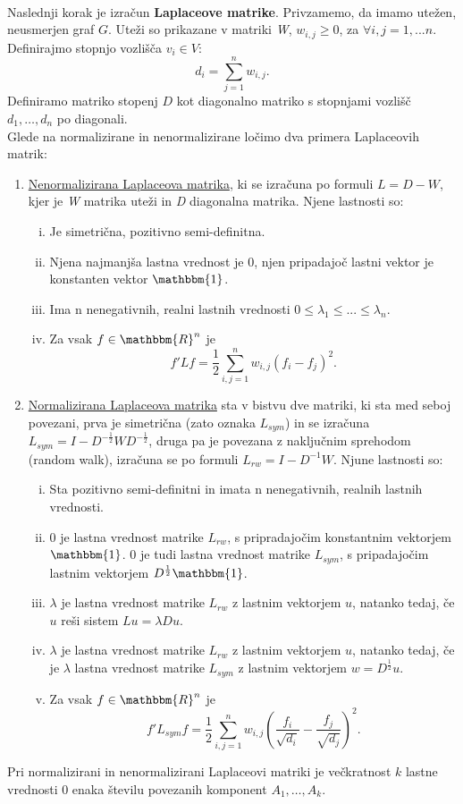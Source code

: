 \documentclass[a4paper, 10pt]{article}
\begin{document}
\\
Naslednji korak je izračun \textbf{Laplaceove matrike}. Privzamemo, da imamo utežen, neusmerjen graf $G$. Uteži so prikazane v matriki \textsl{W}, $w_{i,j} \geq 0$, za $\forall i,j = 1, ... n$. Definirajmo stopnjo vozlišča $v_{i}\in V$: $$ d_i = \sum_{j=1}^n w_{i,j}.$$ Definiramo matriko stopenj $D$ kot diagonalno matriko s stopnjami vozlišč $d_{1},\ldots, d_{n}$ po diagonali.
\\
Glede na normalizirane in nenormalizirane ločimo dva primera Laplaceovih matrik:\\
\begin{enumerate}
\item\underline{Nenormalizirana Laplaceova matrika}, ki se izračuna po formuli $L=D-W$, kjer je \textsl{W} matrika uteži in \textsl{D} diagonalna matrika. Njene lastnosti so:
\begin{enumerate}[i)]
  \item Je simetrična, pozitivno semi-definitna.
  \item Njena najmanjša lastna vrednost je 0, njen pripadajoč lastni vektor je konstanten vektor $\mathbbm{1}$.
  \item Ima n nenegativnih, realni lastnih vrednosti $0 \leq \lambda_1 \leq ... \leq \lambda_n$.
  \item Za vsak $f \in\mathbbm{R}^n$ je $$f'Lf= \frac{1}{2} \sum_{i,j=1}^n w_{i,j}(f_i - f_j)^2.$$
\end{enumerate}

\item\underline{Normalizirana Laplaceova matrika} sta v bistvu dve matriki, ki sta med seboj povezani, prva je simetrična (zato oznaka $L_{sym}$) in se izračuna $L_{sym} = I - D^{-\frac{1}{2}}WD^{-\frac{1}{2}}$, druga pa je povezana z naključnim sprehodom (random walk), izračuna se po formuli $L_{rw} = I - D^{-1}W$.
Njune lastnosti so:
\begin{enumerate}[i)]
  \item Sta pozitivno semi-definitni in imata n nenegativnih, realnih lastnih vrednosti.
  \item 0 je lastna vrednost matrike $L_{rw}$, s pripradajočim konstantnim vektorjem $\mathbbm{1}$. 0 je tudi lastna vrednost matrike $L_{sym}$, s pripadajočim lastnim vektorjem $D^\frac{1}{2}\mathbbm{1}$.
  \item $\lambda$ je lastna vrednost matrike $L_{rw}$ z lastnim vektorjem $u$, natanko tedaj, če $u$ reši sistem $Lu = \lambda Du$.
  \item $\lambda$ je lastna vrednost matrike $L_{rw}$ z lastnim vektorjem $u$, natanko tedaj, če je $\lambda$ lastna vrednost matrike $L_{sym}$ z lastnim vektorjem $w = D^\frac{1}{2}u$.
  \item Za vsak  $f \in\mathbbm{R}^n$ je $$f'L_{sym}f= \frac{1}{2} \sum_{i,j=1}^n w_{i,j}(\frac{f_i}{\sqrt{d_i}} - \frac{f_j}{\sqrt{d_j}})^2.$$
\end{enumerate}
\end{enumerate}
Pri normalizirani in nenormalizirani Laplaceovi matriki je večkratnost $k$ lastne vrednosti 0 enaka številu povezanih komponent $A_{1},\ldots, A_{k}$.
\end{document}
